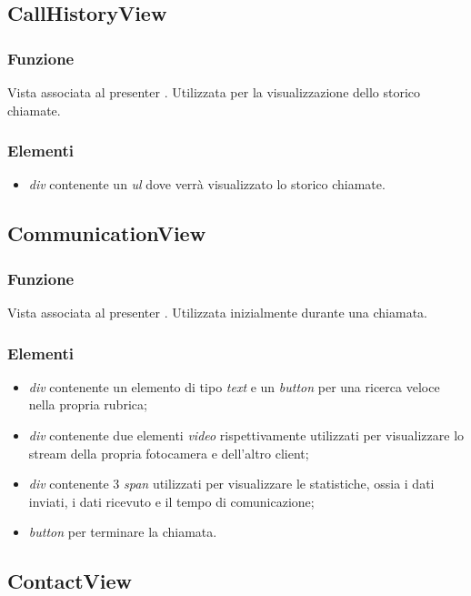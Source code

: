 \subsection{CallHistoryView}
\subsubsection*{Funzione}
Vista associata al presenter . Utilizzata per la visualizzazione dello storico chiamate.
\subsubsection*{Elementi}
\begin{itemize}
\item \textit{div} contenente un \textit{ul} dove verrà visualizzato lo storico chiamate.
\end{itemize}

\subsection{CommunicationView}
\subsubsection*{Funzione}
Vista associata al presenter . Utilizzata inizialmente durante una chiamata.
\subsubsection*{Elementi}
\begin{itemize}
\item \textit{div} contenente un elemento di tipo \textit{text} e un \textit{button} per una ricerca veloce nella propria rubrica;
\item \textit{div} contenente due elementi \textit{video} rispettivamente utilizzati per visualizzare lo stream della propria fotocamera e dell'altro client;
\item \textit{div} contenente 3 \textit{span} utilizzati per visualizzare le statistiche, ossia i dati inviati, i dati ricevuto e il tempo di comunicazione;
\item \textit{button} per terminare la chiamata.
\end{itemize}

\subsection{ContactView}
